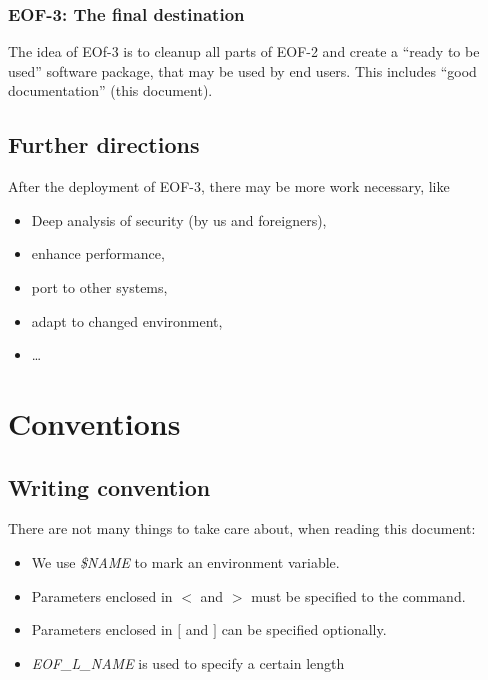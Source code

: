 \documentclass[12pt,a4paper]{book}
\begin{document}
\subsubsection{EOF-3: The final destination}
The idea of EOf-3 is to cleanup all parts of EOF-2 and create a
"`ready to be used"' software package, that may be used by end users.
This includes "`good documentation"' (this document).
\subsection{Further directions}
After the deployment of EOF-3, there may be more work necessary, like
\begin{itemize}
\item Deep analysis of security (by us and foreigners),
\item enhance performance,
\item port to other systems,
\item adapt to changed environment,
\item \ldots{}
\end{itemize}
\section{Conventions}
\subsection{Writing convention}
There are not many things to take care about, when reading this document:
\begin{itemize}
\item We use \emph{\$NAME} to mark an environment variable.
\item Parameters enclosed in $<$ and $>$ must be specified to the command.
\item Parameters enclosed in $[$ and $]$ can be specified optionally.
\item \emph{EOF\_L\_\textit{NAME}} is used to specify a certain length
\end{itemize}
\end{document}
